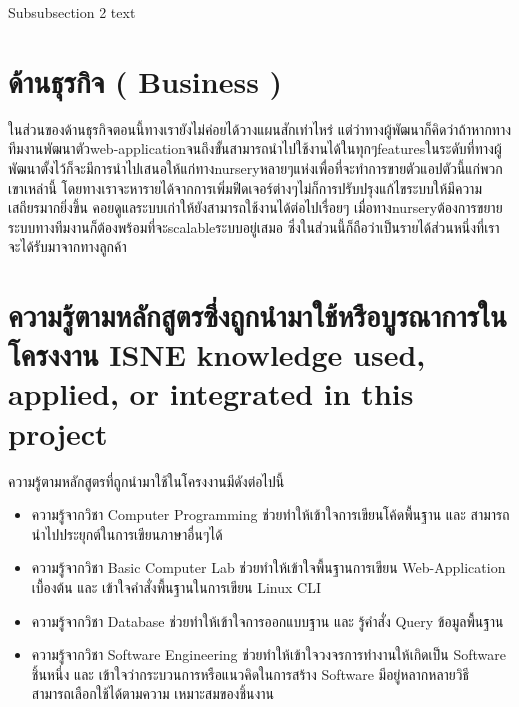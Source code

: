 


Subsubsection 2 text

\section{ ด้านธุรกิจ ( Business )
}
ในส่วนของด้านธุรกิจตอนนี้ทางเรายังไม่ค่อยได้วางแผนสักเท่าไหร่ แต่ว่าทางผู้พัฒนาก็คิดว่าถ้าหากทางทีมงานพัฒนาตัวweb-applicationจนถึงขั้นสามารถนำไปใช้งานได้ในทุกๆfeaturesในระดับที่ทางผู้พัฒนาตั้งไว้ก็จะมีการนำไปเสนอให้แก่ทางnurseryหลายๆแห่งเพื่อที่จะทำการขายตัวแอปตัวนี้แก่พวกเขาเหล่านี้ โดยทางเราจะหารายได้จากการเพิ่มฟีดเจอร์ต่างๆไม่ก็การปรับปรุงแก้ไขระบบให้มีความเสถียรมากยิ่งขึ้น คอยดูแลระบบเก่าให้ยังสามารถใช้งานได้ต่อไปเรื่อยๆ 	เมื่อทางnurseryต้องการขยายระบบทางทีมงานก็ต้องพร้อมที่จะscalableระบบอยู่เสมอ ซึ่งในส่วนนี้ก็ถือว่าเป็นรายได้ส่วนหนึ่งที่เราจะได้รับมาจากทางลูกค้า


\section{\ifcpe%
ความรู้ตามหลักสูตรซึ่งถูกนำมาใช้หรือบูรณาการในโครงงาน
\else%
ISNE knowledge used, applied, or integrated in this project
\fi
}

ความรู้ตามหลักสูตรที่ถูกนำมาใช้ในโครงงานมีดังต่อไปนี้
\begin{itemize}
  \item ความรู้จากวิชา Computer Programming ช่วยทำให้เข้าใจการเขียนโค้ดพื้นฐาน และ สามารถนำไปประยุกต์ในการเขียนภาษาอื่นๆได้
  \item ความรู้จากวิชา Basic Computer Lab ช่วยทำให้เข้าใจพื้นฐานการเขียน Web-Application เบื้องต้น และ เข้าใจคำสั่งพื้นฐานในการเขียน Linux CLI
  \item ความรู้จากวิชา Database ช่วยทำให้เข้าใจการออกแบบฐาน และ รู้คำสั่ง Query ข้อมูลพื้นฐาน
  \item ความรู้จากวิชา Software Engineering ช่วยทำให้เข้าใจวงจรการทำงานให้เกิดเป็น Software ชิ้นหนึ่ง และ เข้าใจว่ากระบวนการหรือแนวคิดในการสร้าง Software มีอยู่หลากหลายวิธี สามารถเลือกใช้ได้ตามความ
  เหมาะสมของชิ้นงาน 
  
\end{itemize}


